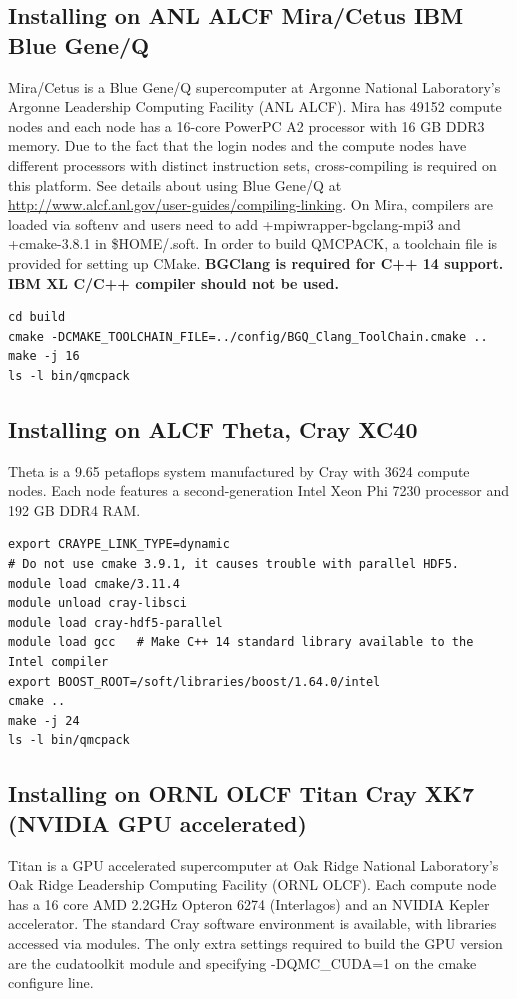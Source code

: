 \subsection{Installing on ANL ALCF Mira/Cetus IBM Blue Gene/Q}
\label{sec:buildbgq}
Mira/Cetus is a Blue Gene/Q supercomputer at Argonne National Laboratory's Argonne Leadership Computing Facility (ANL ALCF).
Mira has 49152 compute nodes and each node has a 16-core PowerPC A2 processor with 16 GB DDR3 memory.
Due to the fact that the login nodes and the compute nodes have different processors with distinct instruction sets,
cross-compiling is required on this platform. See details about using Blue Gene/Q at \url{http://www.alcf.anl.gov/user-guides/compiling-linking}.
On Mira, compilers are loaded via softenv and users need to add +mpiwrapper-bgclang-mpi3 and +cmake-3.8.1 in \$HOME/.soft.
In order to build QMCPACK, a toolchain file is provided for setting up CMake.
\textbf{BGClang is required for C++ 14 support. IBM XL C/C++ compiler should not be used.}

\verbatimfont{\footnotesize}%
\begin{verbatim}
cd build
cmake -DCMAKE_TOOLCHAIN_FILE=../config/BGQ_Clang_ToolChain.cmake ..
make -j 16
ls -l bin/qmcpack
\end{verbatim}

\subsection{Installing on ALCF Theta, Cray XC40}
Theta is a 9.65 petaflops system manufactured by Cray with 3624 compute nodes.
Each node features a second-generation Intel Xeon Phi 7230 processor and 192 GB DDR4 RAM.

\verbatimfont{\footnotesize}%
\begin{verbatim}
export CRAYPE_LINK_TYPE=dynamic
# Do not use cmake 3.9.1, it causes trouble with parallel HDF5.
module load cmake/3.11.4
module unload cray-libsci
module load cray-hdf5-parallel
module load gcc   # Make C++ 14 standard library available to the Intel compiler
export BOOST_ROOT=/soft/libraries/boost/1.64.0/intel
cmake ..
make -j 24
ls -l bin/qmcpack
\end{verbatim}

\subsection{Installing on ORNL OLCF Titan Cray XK7 (NVIDIA GPU
  accelerated)}
\label{sec:titanbuildgpu}
Titan is a GPU accelerated supercomputer at Oak Ridge National
Laboratory's  Oak Ridge Leadership Computing Facility  (ORNL OLCF). Each
compute node has a 16 core AMD 2.2GHz Opteron 6274 (Interlagos) and an
NVIDIA Kepler accelerator. The standard Cray software environment is
available, with libraries accessed via modules. The only extra
settings required to build the GPU version are the cudatoolkit module
and specifying -DQMC\_CUDA=1 on the cmake configure line.

